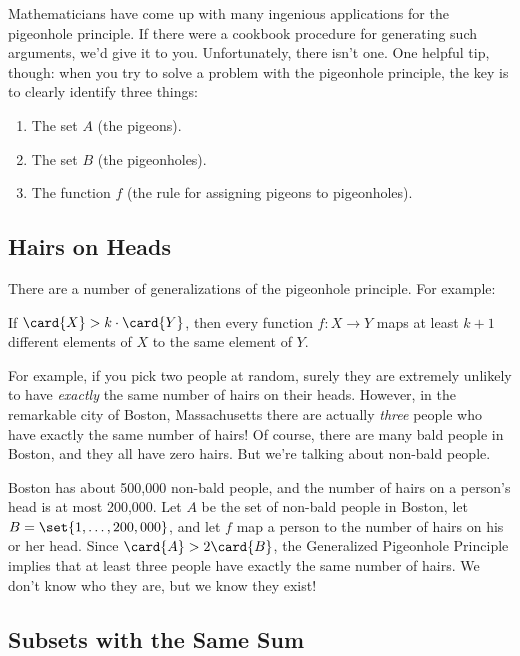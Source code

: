Mathematicians have come up with many ingenious applications for the
pigeonhole principle.  If there were a cookbook procedure for
generating such arguments, we'd give it to you.  Unfortunately, there
isn't one.  One helpful tip, though: when you try to solve a problem
with the pigeonhole principle, the key is to clearly identify three
things:

\begin{enumerate}

\item The set $A$ (the pigeons).

\item The set $B$ (the pigeonholes).

\item The function $f$ (the rule for assigning pigeons to pigeonholes).

\end{enumerate}

\subsection{Hairs on Heads}

There are a number of generalizations of the pigeonhole principle.
For example:

\begin{mathrule}
If $\card{X} > k \cdot \card{Y}$, then every function $f : X \to Y$
maps at least $k+1$ different elements of $X$ to the same element of
$Y$.
\end{mathrule}

For example, if you pick two people at random, surely they are
extremely unlikely to have \emph{exactly} the same number of hairs
on their heads.  However, in the remarkable city of Boston,
Massachusetts there are actually \emph{three} people who have
exactly the same number of hairs!  Of course, there are many bald
people in Boston, and they all have zero hairs.  But we're talking about
non-bald people.

Boston has about 500,000 non-bald people, and the number of hairs on a
person's head is at most 200,000.  Let $A$ be the set of non-bald
people in Boston, let $B = \set{1, \ldots, 200,000}$, and let $f$ map
a person to the number of hairs on his or her head.  Since $\card{A} >
2 \card{B}$, the Generalized Pigeonhole Principle implies that at
least three people have exactly the same number of hairs.  We don't
know who they are, but we know they exist!

\subsection{Subsets with the Same Sum}

